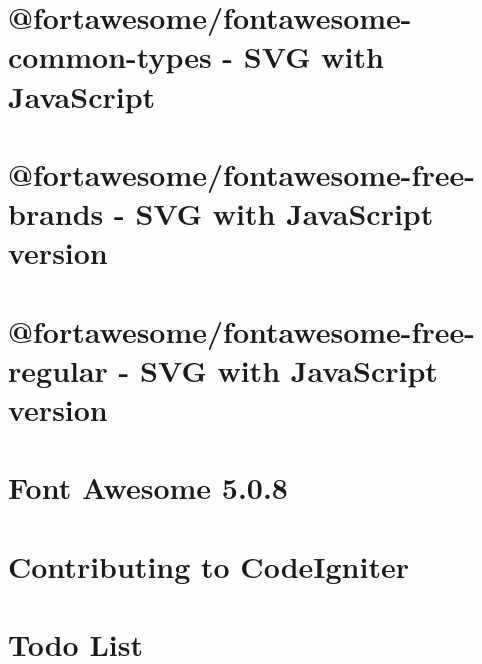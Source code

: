 \let\mypdfximage\pdfximage\def\pdfximage{\immediate\mypdfximage}\documentclass[twoside]{book}
\newcommand{\+}{\discretionary{\mbox{\scriptsize$\hookleftarrow$}}{}{}}
\begin{document}
\chapter{@fortawesome/fontawesome-\/common-\/types -\/ S\+VG with Java\+Script}
\label{md_assets_fontawesome-free-5_80_88_advanced-options_use-with-node-js_fontawesome-common-types__r_e_a_d_m_e}

\chapter{@fortawesome/fontawesome-\/free-\/brands -\/ S\+VG with Java\+Script version}
\label{md_assets_fontawesome-free-5_80_88_advanced-options_use-with-node-js_fontawesome-free-brands__r_e_a_d_m_e}

\chapter{@fortawesome/fontawesome-\/free-\/regular -\/ S\+VG with Java\+Script version}
\label{md_assets_fontawesome-free-5_80_88_advanced-options_use-with-node-js_fontawesome-free-regular__r_e_a_d_m_e}

\chapter{Font Awesome 5.0.8}
\label{md_assets_fontawesome-free-5_80_88__r_e_a_d_m_e}

\chapter{Contributing to Code\+Igniter}
\label{md_contributing}

\chapter{Todo List}
\label{todo}

\end{document}
